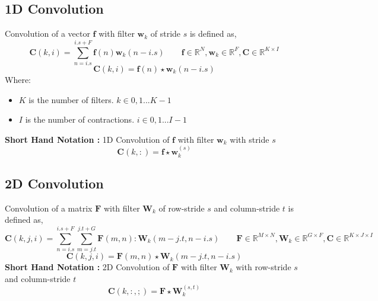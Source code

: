 \begin{appendices}
\subsection{1D Convolution}
\label{1dconv}
Convolution of a vector $\textbf{f}$ with filter $\textbf{w}_{k}$ of stride $s$ is defined as, 
\begin{equation}
\textbf{C}(k, i) = \displaystyle\sum_{n=i.s}^{i.s + F}\textbf{f}(n)\textbf{w}_{k}(n-i.s) \qquad \textbf{f} \in \mathbb{R}^{N}, \textbf{w}_{k} \in \mathbb{R}^{F}, \textbf{C} \in \mathbb{R}^{K \times I}
\end{equation}
\[
\textbf{C}(k,i) = \textbf{f}(n)\star\textbf{w}_{k}(n-i.s)
\]
Where:
\begin{itemize}[label=]
    \setlength\itemsep{0em}
    \item $K$ is the number of filters. $k \in {0,1...K-1}$ 
    \item $I$ is the number of contractions. $i \in {0,1...I-1}$
\end{itemize}
\textbf{Short Hand Notation :} 1D Convolution of $\textbf{f}$ with filter $\textbf{w}_{k}$ with stride $s$
\[
\boxed{
\textbf{C}(k,:) = \textbf{f}\star\textbf{w}^{(s)}_{k}
}  
\]

\subsection{2D Convolution}
\label{2dconv}
Convolution of a matrix $\textbf{F}$ with filter $\textbf{W}_{k}$ of row-stride $s$ and column-stride $t$ is defined as, 
\begin{equation}
\textbf{C}(k, j, i) = \displaystyle\sum_{n=i.s}^{i.s + F}\displaystyle\sum_{m=j.t}^{j.t + G}\textbf{F}(m,n):\textbf{W}_{k}(m-j.t, n-i.s) \qquad \textbf{F} \in \mathbb{R}^{M \times N}, \textbf{W}_{k} \in \mathbb{R}^{G \times F}, \textbf{C} \in \mathbb{R}^{K \times J \times I}
\end{equation}
\[
\textbf{C}(k,j,i) = \textbf{F}(m,n)\star\textbf{W}_{k}(m-j.t, n-i.s)
\]
\textbf{Short Hand Notation :} 2D Convolution of $\textbf{F}$ with filter $\textbf{W}_{k}$ with row-stride $s$ and column-stride $t$
\[
\boxed{
\textbf{C}(k,:,;) = \textbf{F}\star\textbf{W}^{(s,t)}_{k}
}  
\]

\end{appendices}
